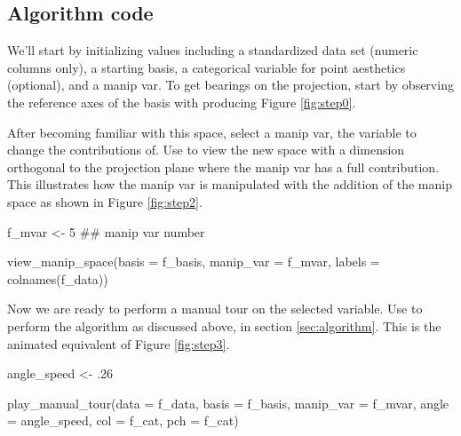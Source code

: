 \hypertarget{algorithm-code}{%
\subsection{Algorithm code}\label{algorithm-code}}

We'll start by initializing values including a standardized data set
(numeric columns only), a starting basis, a categorical variable for
point aesthetics (optional), and a manip var. To get bearings on the
projection, start by observing the reference axes of the basis with
 producing Figure \ref{fig:step0}.

\begin{Schunk}
\end{Schunk}

After becoming familiar with this space, select a manip var, the
variable to change the contributions of. Use 
to view the new space with a dimension orthogonal to the projection
plane where the manip var has a full contribution. This illustrates how
the manip var is manipulated with the addition of the manip space as
shown in Figure \ref{fig:step2}.

\begin{Schunk}
\begin{Sinput}
f_mvar  <- 5  ## manip var number

view_manip_space(basis = f_basis, 
                 manip_var = f_mvar, 
                 labels = colnames(f_data))
\end{Sinput}
\end{Schunk}

Now we are ready to perform a manual tour on the selected variable. Use
 to perform the algorithm as discussed above,
in section \ref{sec:algorithm}. This is the animated equivalent of
Figure \ref{fig:step3}.

\begin{Schunk}
\begin{Sinput}
angle_speed <- .26

play_manual_tour(data = f_data,
                 basis = f_basis, 
                 manip_var = f_mvar, 
                 angle = angle_speed,
                 col = f_cat,
                 pch = f_cat)
\end{Sinput}
\end{Schunk}

